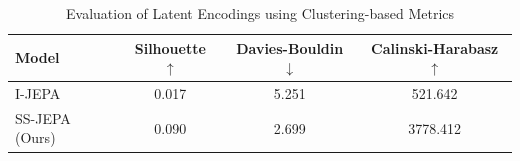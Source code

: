 \begin{table}
	\begin{center}
		\begin{tabular}{lccc}
			\toprule
			Model          & Silhouette $\uparrow$ & Davies-Bouldin $\downarrow$ & Calinski-Harabasz $\uparrow$ \\
			\midrule
			I-JEPA         & 0.017                 & 5.251                       & 521.642                      \\
			SS-JEPA (Ours) & 0.090                 & 2.699                       & 3778.412                     \\
			\bottomrule
		\end{tabular}
	\end{center}
	\vspace{0.5em}
	\caption{Evaluation of Latent Encodings using Clustering-based Metrics}\label{tab:latent-metrics.tex}
\end{table}


